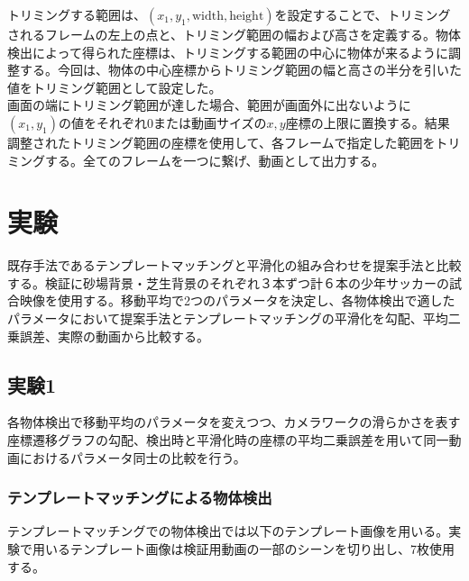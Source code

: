 \documentclass[11pt,a4j]{jreport}
\begin{document}
トリミングする範囲は、$(x_1, y_1, \text{width}, \text{height})$を設定することで、トリミングされるフレームの左上の点と、トリミング範囲の幅および高さを定義する。物体検出によって得られた座標は、トリミングする範囲の中心に物体が来るように調整する。今回は、物体の中心座標からトリミング範囲の幅と高さの半分を引いた値をトリミング範囲として設定した。\\
画面の端にトリミング範囲が達した場合、範囲が画面外に出ないように$(x_1, y_1)$の値をそれぞれ0または動画サイズの$x, y$座標の上限に置換する。結果調整されたトリミング範囲の座標を使用して、各フレームで指定した範囲をトリミングする。全てのフレームを一つに繋げ、動画として出力する。

\chapter{実験}
既存手法であるテンプレートマッチングと平滑化の組み合わせを提案手法と比較する。検証に砂場背景・芝生背景のそれぞれ３本ずつ計６本の少年サッカーの試合映像を使用する。移動平均で2つのパラメータを決定し、各物体検出で適したパラメータにおいて提案手法とテンプレートマッチングの平滑化を勾配、平均二乗誤差、実際の動画から比較する。

\section{実験1}

各物体検出で移動平均のパラメータを変えつつ、カメラワークの滑らかさを表す座標遷移グラフの勾配、検出時と平滑化時の座標の平均二乗誤差を用いて同一動画におけるパラメータ同士の比較を行う。

\subsection{テンプレートマッチングによる物体検出}
テンプレートマッチングでの物体検出では以下のテンプレート画像を用いる。実験で用いるテンプレート画像は検証用動画の一部のシーンを切り出し、7枚使用する。
\end{document}
